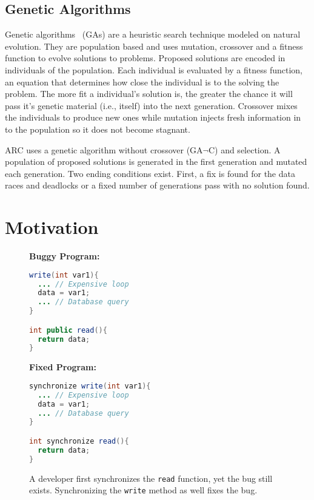 \documentclass{llncs}
\begin{document}
\subsection{Genetic Algorithms}
\label{sec:genetic_algorithms}

Genetic algorithms~\cite{GA92} (GAs) are a heuristic search technique modeled on natural evolution.  They are population based and uses mutation, crossover and a fitness function to evolve solutions to problems. Proposed solutions are encoded in individuals of the population. Each individual is evaluated by a fitness function, an equation that determines how close the individual is to the solving the problem. The more fit a individual's solution is, the greater the chance it will pass it's genetic material (i.e., itself) into the next generation. Crossover mixes the individuals to produce new ones while mutation injects fresh information in to the population so it does not become stagnant.

ARC uses a genetic algorithm without crossover (GA$\neg$C) and selection. A population of proposed solutions is generated in the first generation and mutated each generation. Two ending conditions exist.  First, a fix is found for the data races and deadlocks or a fixed number of generations pass with no solution found.



\section{Motivation}
\label{sec:motivation}

\begin{figure}[t!]
\begin{minipage}{5cm}
\footnotesize{\textbf{Buggy Program:}}
\begin{lstlisting}[language=Java, morekeywords={synchronize}]
write(int var1){
  ... // Expensive loop
  data = var1;
  ... // Database query
}

int public read(){
  return data;
}
\end{lstlisting}
\end{minipage}\hfill
\begin{minipage}{5cm}
\footnotesize{\textbf{Fixed Program:}}
\begin{lstlisting}[language=Java, morekeywords={synchronize}]
synchronize write(int var1){
  ... // Expensive loop
  data = var1;
  ... // Database query
}

int synchronize read(){
  return data;
}
\end{lstlisting}
\end{minipage}
\caption{A developer first synchronizes the \texttt{read} function, yet the bug
still exists. Synchronizing the \texttt{write} method as well fixes the bug.}
\label{fig:fixed_sample_datarace}
\end{figure}
\end{document}
